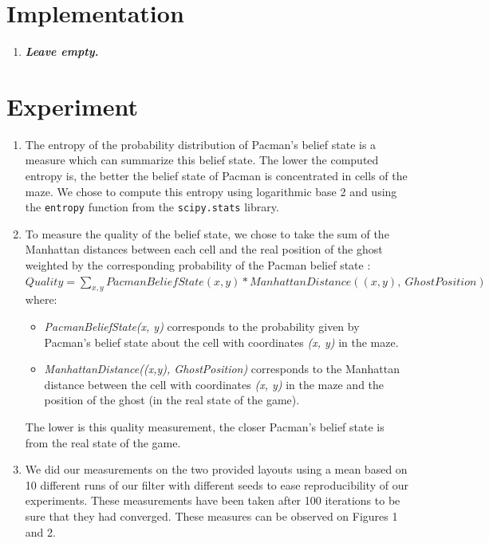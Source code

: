 \documentclass{article}
\begin{document}
\section{Implementation}

\begin{enumerate}[label=\alph*.,leftmargin=*]
    \item \textbf{\textit{Leave empty.}}
\end{enumerate}

\section{Experiment}

\begin{enumerate}[label=\alph*.,leftmargin=*]
    \item The entropy of the probability distribution of Pacman's belief state is a measure which can summarize this belief state. 
    The lower the computed entropy is, the better the belief state of Pacman is concentrated in cells of the maze. We chose to compute this entropy using logarithmic base 2 and using the \texttt{entropy} function from the \texttt{scipy.stats} library.
    
    \item To measure the quality of the belief state, we chose to take the sum of the Manhattan distances between each cell and the real position of the ghost weighted by the corresponding probability of the Pacman belief state :\\
    
    $Quality = {\sum_{x, y} {PacmanBeliefState(x, y) * ManhattanDistance((x, y), \ GhostPosition)}}$\\

    where:
    \begin{itemize}
    	\item \textit{PacmanBeliefState(x, y)} corresponds to the probability given by Pacman's belief state about the cell with coordinates \textit{(x, y)} in the maze.
    	\item \textit{ManhattanDistance((x,y), GhostPosition)} corresponds to the Manhattan distance between the cell with coordinates \textit{(x, y)} in the maze and the position of the ghost (in the real state of the game).
	\end{itemize}        
     The lower is this quality measurement, the closer Pacman's belief state is from the real state of the game.
    \item We did our measurements on the two provided layouts using a mean based on 10 different runs of our filter with different seeds to ease reproducibility of our experiments. These measurements have been taken after 100 iterations to be sure that they had converged.
    These measures can be observed on Figures 1 and 2. 


\end{enumerate}
\end{document}

